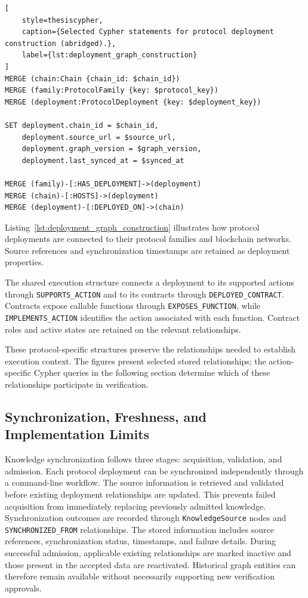 \begin{lstlisting}[
    style=thesiscypher,
    caption={Selected Cypher statements for protocol deployment construction (abridged).},
    label={lst:deployment_graph_construction}
]
MERGE (chain:Chain {chain_id: $chain_id})
MERGE (family:ProtocolFamily {key: $protocol_key})
MERGE (deployment:ProtocolDeployment {key: $deployment_key})

SET deployment.chain_id = $chain_id,
    deployment.source_url = $source_url,
    deployment.graph_version = $graph_version,
    deployment.last_synced_at = $synced_at

MERGE (family)-[:HAS_DEPLOYMENT]->(deployment)
MERGE (chain)-[:HOSTS]->(deployment)
MERGE (deployment)-[:DEPLOYED_ON]->(chain)
\end{lstlisting}


Listing~\ref{lst:deployment_graph_construction}
illustrates how protocol deployments are connected to
their protocol families and blockchain networks.
Source references and synchronization timestamps
are retained as deployment properties.


The shared execution structure connects a deployment to
its supported actions through \texttt{SUPPORTS\_ACTION}
and to its contracts through \texttt{DEPLOYED\_CONTRACT}.
Contracts expose callable functions through
\texttt{EXPOSES\_FUNCTION}, while
\texttt{IMPLEMENTS\_ACTION} identifies the action
associated with each function. Contract roles and active
states are retained on the relevant relationships.

These protocol-specific structures preserve the relationships
needed to establish execution context. The figures present
selected stored relationships; the action-specific Cypher
queries in the following section determine which of these
relationships participate in verification.

\subsection{Synchronization, Freshness, and Implementation Limits}

Knowledge synchronization follows three stages:
acquisition, validation, and admission. Each protocol
deployment can be synchronized independently through
a command-line workflow. The source information is
retrieved and validated before existing deployment
relationships are updated. This prevents failed acquisition
from immediately replacing previously admitted knowledge. Synchronization outcomes are recorded through
\texttt{KnowledgeSource} nodes and
\texttt{SYNCHRONIZED\_FROM} relationships. The stored
information includes source references, synchronization
status, timestamps, and failure details. During successful
admission, applicable existing relationships are marked
inactive and those present in the accepted data are
reactivated. Historical graph entities can therefore
remain available without necessarily supporting new
verification approvals.

